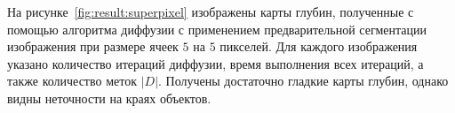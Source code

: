 \documentclass{ConfFTI}
\begin{document}
\begin{figure}[h!]
{        \label{fig:poster:pixel}
    }
    \label{fig:result:pixel}
\end{figure}

На рисунке~\ref{fig:result:superpixel} изображены карты глубин,
полученные с помощью алгоритма диффузии
с применением предварительной сегментации
изображения при размере ячеек $5$ на $5$ пикселей.
Для каждого изображения указано количество итераций диффузии,
время выполнения всех итераций, а также количество меток $\left| D \right|$.
Получены достаточно гладкие карты глубин,
однако видны неточности на краях объектов.
\end{document}
